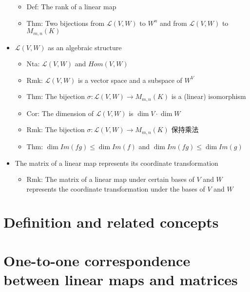 \documentclass[onecolumn]{ctexart}
\begin{document}
\begin{itemize}
\begin{itemize}
    \item Def: The rank of a linear map
    \item Thm: Two bijections from $\mathcal{L}(V, W)$ to $W^n$ and from $\mathcal{L}(V, W)$ to $M_{m, n}(K)$
  \end{itemize}
  \item $\mathcal{L}(V, W)$ as an algebraic structure
  \begin{itemize}
    \item Nta: $\mathcal{L}(V, W)$ and $Hom(V, W)$
    \item Rmk: $\mathcal{L}(V, W)$ is a vector space and a subspace of $W^V$
    \item Thm: The bijection $\sigma: \mathcal{L}(V, W) \to M_{m, n}(K)$ is a (linear) isomorphism
    \item Cor: The dimension of $\mathcal{L}(V, W)$ is $\dim V \cdot \dim W$
    \item Rmk: The bijection $\sigma: \mathcal{L}(V, W) \to M_{m, n}(K)$ 保持乘法
    \item Thm: $\dim Im(fg) \leq \dim Im(f)$ and $\dim Im(fg) \leq \dim Im(g)$
  \end{itemize}
  \item The matrix of a linear map represents its coordinate transformation
  \begin{itemize}
    \item Rmk: The matrix of a linear map under certain bases of $V$ and $W$ represents the coordinate transformation under the bases of $V$ and $W$
  \end{itemize}
\end{itemize}

\section{Definition and related concepts}

\section{One-to-one correspondence between linear maps and matrices}
\end{document}
